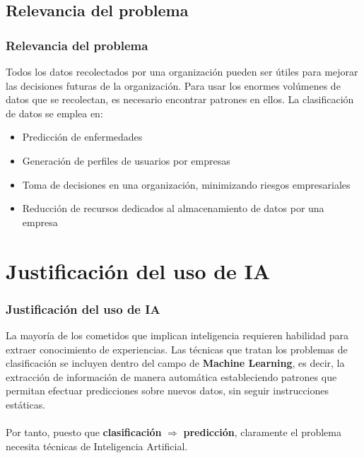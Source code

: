 \documentclass[8pt]{beamer}
\begin{document}
\subsection{Relevancia del problema}
  \begin{frame}
    \frametitle{Relevancia del problema}
    
    Todos los datos recolectados por una organización pueden ser útiles para
    mejorar las decisiones futuras de la organización. Para usar los enormes
    volúmenes de datos que se recolectan, es necesario encontrar patrones en
    ellos. La clasificación de datos se emplea en:
    
    \pause
    \begin{itemize}[<+->]
     \item Predicción de enfermedades
     \item Generación de perfiles de usuarios por empresas
     \item Toma de decisiones en una organización, minimizando riesgos empresariales
     \item Reducción de recursos dedicados al almacenamiento de datos por una empresa
    \end{itemize}
  \end{frame}
  

\section{Justificación del uso de IA}
  \begin{frame}
    \frametitle{Justificación del uso de IA}
      La mayoría de los cometidos que implican inteligencia requieren habilidad
      para extraer conocimiento de experiencias. Las técnicas que tratan los problemas 
      de clasificación se incluyen dentro del campo de \textbf{Machine Learning},
      es decir, la extracción de información de manera automática estableciendo patrones
      que permitan efectuar predicciones sobre nuevos datos, sin seguir instrucciones 
      estáticas. 
      \\~\\
      Por tanto, puesto que \textbf{clasificación} $\Longrightarrow$ 
      \textbf{predicción}, claramente el problema necesita técnicas de Inteligencia 
      Artificial.
  \end{frame}
\end{document}
